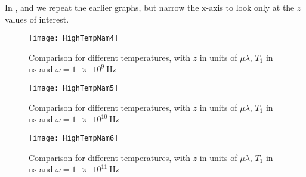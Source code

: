 \documentclass[../main.tex]{subfiles}
\begin{document}
	In ,  and  we repeat the earlier graphs, but narrow the x-axis to look only at the $z$ values of interest.

	\begin{figure}[htp]
		\centering
		\texttt{[image: HighTempNam4]}
		\caption{Comparison for different temperatures, with $z$ in units of $\mu \lambda$, $T_1$ in $\si{\nano\second}$ and $\omega = \SI{1e9}{\Hz}$} \label{fig:htn:1GHz}
	\end{figure}
	\begin{figure}[htp]
		\centering
		\texttt{[image: HighTempNam5]}
		\caption{Comparison for different temperatures, with $z$ in units of $\mu \lambda$, $T_1$ in $\si{\nano\second}$ and $\omega = \SI{1e10}{\Hz}$} \label{fig:htn:10GHz}
	\end{figure}
	\begin{figure}[htp]
		\centering
		\texttt{[image: HighTempNam6]}
		\caption{Comparison for different temperatures, with $z$ in units of $\mu \lambda$, $T_1$ in $\si{\nano\second}$ and $\omega = \SI{1e11}{\Hz}$} \label{fig:htn:100GHz}
	\end{figure}
\end{document}
